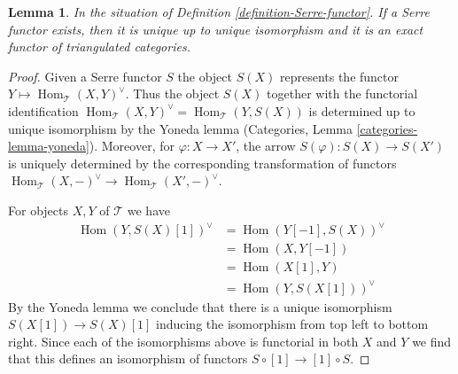 \documentclass{stacks-project}
\theoremstyle{plain}
\newtheorem{lemma}[subsection]{Lemma}
\theoremstyle{definition}
\theoremstyle{remark}
\numberwithin{equation}{subsection}
\def\Hom{\mathop{\mathrm{Hom}}\nolimits}
\begin{document}
\begin{lemma}
\label{lemma-Serre-functor}
In the situation of Definition \ref{definition-Serre-functor}.
If a Serre functor exists, then it is unique up to unique isomorphism and
it is an exact functor of triangulated categories.
\end{lemma}

\begin{proof}
Given a Serre functor $S$ the object $S(X)$ represents
the functor $Y \mapsto \Hom_\mathcal{T}(X, Y)^\vee$.
Thus the object $S(X)$ together with the functorial identification
$\Hom_\mathcal{T}(X, Y)^\vee = \Hom_\mathcal{T}(Y, S(X))$
is determined up to unique isomorphism by the Yoneda lemma
(Categories, Lemma \ref{categories-lemma-yoneda}).
Moreover, for $\varphi : X \to X'$, the arrow $S(\varphi) : S(X) \to S(X')$
is uniquely determined by the corresponding transformation of functors
$\Hom_\mathcal{T}(X, -)^\vee \to \Hom_\mathcal{T}(X', -)^\vee$.

\medskip\noindent
For objects $X, Y$ of $\mathcal{T}$ we have
\begin{align*}
\Hom(Y, S(X)[1])^\vee
& =
\Hom(Y[-1], S(X))^\vee \\
& =
\Hom(X, Y[-1]) \\
& =
\Hom(X[1], Y) \\
& =
\Hom(Y, S(X[1]))^\vee
\end{align*}
By the Yoneda lemma we conclude that there is a unique isomorphism
$S(X[1]) \to S(X)[1]$ inducing the isomorphism from top left to bottom right.
Since each of the isomorphisms above is functorial in both $X$ and $Y$
we find that this defines an isomorphism of functors
$S \circ [1] \to [1] \circ S$.


\end{proof}
\end{document}
